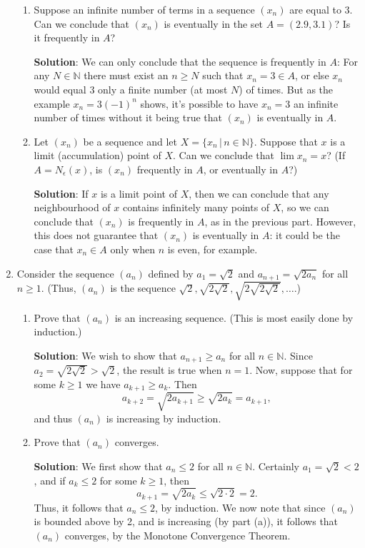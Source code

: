 \documentclass[letterpaper,12pt]{article}
\newcommand{\N}{\mathbb{N}}
\begin{document}
\begin{enumerate}
\begin{enumerate}
 \item Suppose an infinite number of terms in a sequence $(x_n)$ are equal to 3. Can we conclude that $(x_n)$ is eventually in the set $A=(2.9, 3.1)$? Is it frequently in $A$?
 
 
\bigskip

{\bf Solution}: We can only conclude that the sequence is frequently in $A$: For any $N\in\N$ there must exist an $n\geq N$ such that $x_n=3\in A$, or else $x_n$ would equal 3 only a finite number (at most $N$) of times. But as the example $x_n = 3(-1)^n$ shows, it's possible to have $x_n=3$ an infinite number of times without it being true that $(x_n)$ is eventually in $A$.

 \item Let $(x_n)$ be a sequence and let $X=\{x_n\,|\, n\in \N\}$. Suppose that $x$ is a limit (accumulation) point of $X$. Can we conclude that $\lim x_n = x$? (If $A=N_\epsilon(x)$, is $(x_n)$ frequently in $A$, or eventually in $A$?)
 
 
\bigskip

{\bf Solution}: If $x$ is a limit point of $X$, then we can conclude that any neighbourhood of $x$ contains infinitely many points of $X$, so we can conclude that $(x_n)$ is frequently in $A$, as in the previous part. However, this does not guarantee that $(x_n)$ is eventually in $A$: it could be the case that $x_n\in A$ only when $n$ is even, for example.


\end{enumerate}
  \item Consider the sequence $(a_n)$ defined by $a_1 = \sqrt{2}$ and $a_{n+1} = \sqrt{2a_n}$ for all $n\geq 1$. (Thus, $(a_n)$ is the sequence $\sqrt{2},\sqrt{2\sqrt{2}},\sqrt{2\sqrt{2\sqrt{2}}},\ldots$.)
\begin{enumerate}
 \item Prove that $(a_n)$ is an increasing sequence. (This is most easily done by induction.)
  
\bigskip

{\bf Solution}:  We wish to show that $a_{n+1}\geq a_n$ for all $n\in \N$. Since $a_2 = \sqrt{2\sqrt{2}}>\sqrt{2}$, the result is true when $n=1$. Now, suppose that for some $k\geq 1$ we have $a_{k+1}\geq a_k$. Then
\[
a_{k+2} = \sqrt{2a_{k+1}}\geq \sqrt{2a_k} = a_{k+1},
\]
and thus $(a_n)$ is increasing by induction.
 \item Prove that $(a_n)$ converges.
 
\bigskip

{\bf Solution}: We first show that $a_n\leq 2$ for all $n\in\N$. Certainly $a_1=\sqrt{2}<2$, and if $a_k\leq 2$ for some $k\geq 1$, then
\[
a_{k+1} = \sqrt{2a_k}\leq \sqrt{2\cdot 2} = 2.
\]
Thus, it follows that $a_n\leq 2$, by induction. We now note that since $(a_n)$ is bounded above by 2, and is increasing (by part (a)), it follows that $(a_n)$ converges, by the Monotone Convergence Theorem.
 

\end{enumerate}
\end{enumerate}
\end{document}
